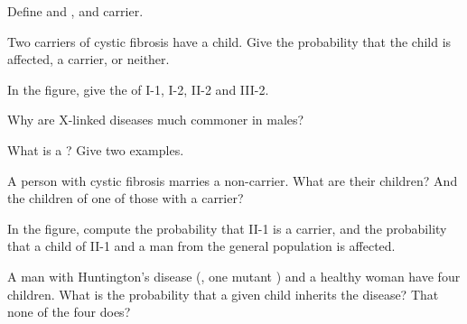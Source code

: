 \begin{exercise}[$\star$]\label{exo:g11:genes-and-disease:1}
Define  and  , and carrier.
\end{exercise}

\begin{exercise}[$\star$]\label{exo:g11:genes-and-disease:2}
Two carriers of cystic fibrosis have a child. Give the probability
that the child is affected, a carrier, or neither.
\end{exercise}

\begin{exercise}[$\star$]\label{exo:g11:genes-and-disease:3}
In the  figure, give the  of I-1, I-2, II-2 and
III-2.
\end{exercise}

\begin{exercise}[$\star$]\label{exo:g11:genes-and-disease:4}
Why are X-linked  diseases much commoner in males?
\end{exercise}

\begin{exercise}[$\star$]\label{exo:g11:genes-and-disease:5}
What is a ? Give two examples.
\end{exercise}

\begin{exercise}[$\star\star$]\label{exo:g11:genes-and-disease:6}
A person with cystic fibrosis marries a non-carrier. What are their
children? And the children of one of those with a carrier?
\end{exercise}

\begin{exercise}[$\star\star$]\label{exo:g11:genes-and-disease:7}
In the  figure, compute the probability that II-1 is a
carrier, and the probability that a child of II-1 and a man from the
general population is affected.
\end{exercise}

\begin{exercise}[$\star\star$]\label{exo:g11:genes-and-disease:8}
A man with Huntington's disease (, one mutant ) and a
healthy woman have four children. What is the probability that a given
child inherits the disease? That none of the four does?
\end{exercise}

